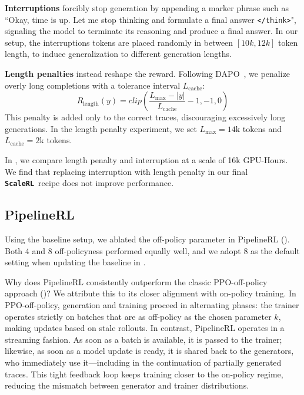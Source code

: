 \documentclass[]{fairmeta} %
\newcommand{\scalerl}{\texttt{\textbf{ScaleRL}}}
\begin{document}
\textbf{Interruptions} forcibly stop generation by appending a marker phrase such as ``Okay, time is up. Let me stop thinking and formulate a final answer \texttt{</think>}", signaling the model to terminate its reasoning and produce a final answer. In our setup, the interruptions tokens are placed randomly in between $[10k, 12k]$ token length, to induce generalization to different generation lengths.

\textbf{Length penalties} instead reshape the reward. 
Following DAPO~\citep{yu2025dapo}, we penalize overly long completions with a tolerance interval $L_{\text{cache}}$: 
\begin{equation}
R_{\text{length}}(y) = clip\left(\dfrac{L_{\max} - |y|}{L_{\text{cache}}} - 1, -1, 0\right)
\end{equation}
This penalty is added only to the correct traces, discouraging excessively long generations. 
In the length penalty experiment, we set $L_{\max} = 14\text{k}$ tokens and $L_{\text{cache}} = 2\text{k}$ tokens.

In , we compare length penalty and interruption at a scale of 16k GPU-Hours. We find that replacing interruption with length penalty in our final \scalerl\ recipe does not improve performance.


\subsection{PipelineRL} \label{appendix:pipelinerl}
Using the baseline setup, we ablated the off-policy parameter in PipelineRL (). 
Both $4$ and $8$ off-policyness performed equally well, and we adopt $8$ as the default setting when updating the baseline in . 

Why does PipelineRL consistently outperform the classic PPO-off-policy approach ()? 
We attribute this to its closer alignment with on-policy training. 
In PPO-off-policy, generation and training proceed in alternating phases: the trainer operates strictly on batches that are as off-policy as the chosen parameter $k$, making updates based on stale rollouts. 
In contrast, PipelineRL operates in a streaming fashion. 
As soon as a batch is available, it is passed to the trainer; likewise, as soon as a model update is ready, it is shared back to the generators, who immediately use it—including in the continuation of partially generated traces. 
This tight feedback loop keeps training closer to the on-policy regime, reducing the mismatch between generator and trainer distributions. 
\end{document}
